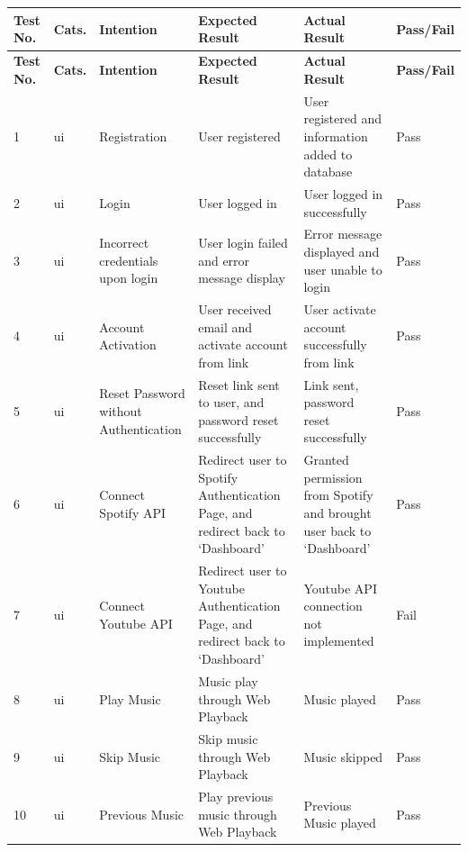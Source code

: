 \newpage
\begin{landscape}
\section{}
\label{app:appendix-d}
\begin{longtable}{ |m{1cm}|m{1.5cm}|m{5cm}|m{6cm}|m{6cm}|m{2cm}| }
    \hline
    \rowcolor{lightgray}
    \textbf{Test No.} & \textbf{Cats.} & \textbf{Intention} & \textbf{Expected Result} & \textbf{Actual Result} & \textbf{Pass/Fail} \\
    \hline
    \endfirsthead

    \hline
    \rowcolor{lightgray}
    \textbf{Test No.} & \textbf{Cats.} & \textbf{Intention} & \textbf{Expected Result} & \textbf{Actual Result} & \textbf{Pass/Fail} \\
    \hline
    \endhead
    1 & \gls{ui} & Registration & User registered & User registered and information added to database & Pass \\
    \hline
    2 & \gls{ui} & Login & User logged in & User logged in successfully & Pass \\
    \hline
    3 & \gls{ui} & Incorrect credentials upon login & User login failed and error message display & Error message displayed and user unable to login & Pass \\
    \hline
    4 & \gls{ui} & Account Activation & User received email and activate account from link & User activate account successfully from link & Pass \\
    \hline
    5 & \gls{ui} & Reset Password without Authentication & Reset link sent to user, and password reset successfully & Link sent, password reset successfully & Pass \\
    \hline
    6 & \gls{ui} & Connect Spotify API & Redirect user to Spotify Authentication Page, and redirect back to `Dashboard' & Granted permission from Spotify and brought user back to `Dashboard' & Pass \\
    \hline
    7 & \gls{ui} & Connect Youtube API & Redirect user to Youtube Authentication Page, and redirect back to `Dashboard' & Youtube API connection not implemented & Fail \\
    \hline
    8 & \gls{ui} & Play Music & Music play through Web Playback & Music played & Pass \\
    \hline
    9 & \gls{ui} & Skip Music & Skip music through Web Playback & Music skipped & Pass \\
    \hline
    10 & \gls{ui} & Previous Music & Play previous music through Web Playback &  Previous Music played & Pass \\

\end{longtable}
\end{landscape}
